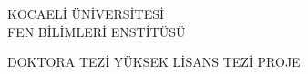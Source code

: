 \begin{titlepage}
\centering
\bfseries
\fontsize{14}{16.8}\selectfont
\begin{minipage}[t][3.5cm][t]{\textwidth}
	\centering
	KOCAELİ ÜNİVERSİTESİ \\ FEN BİLİMLERİ ENSTİTÜSÜ 
\end{minipage} 

\begin{minipage}[t][3.5cm][t]{\textwidth}
	\centering
	\MakeUppercase{\Dept}	
\end{minipage} 
\begin{minipage}[t][4.0cm][t]{\textwidth}
	\centering
	\ifphd
		\MakeUppercase{DOKTORA TEZİ}
	\fi
	\ifmsc
		\MakeUppercase{YÜKSEK LİSANS TEZİ}
	\else
		\MakeUppercase{PROJE}
	\fi
\end{minipage} 

\begin{minipage}[t][6.0cm][t]{\textwidth}
	\centering
	\MakeUppercase{\Title}
\end{minipage} 
\begin{minipage}[t][2.0cm][t]{\textwidth}
	\centering
	\MakeUppercase{\Author}
\end{minipage} 
\vfill
\vbox{\MakeUppercase{\Date}}	
\end{titlepage}

\newpage


